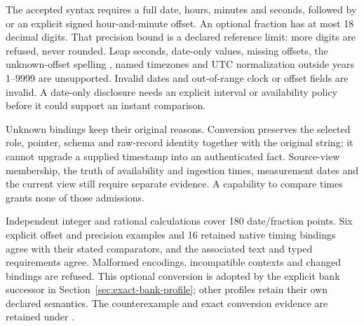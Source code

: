 The accepted syntax requires a full date, hours, minutes and seconds, followed
by  or an explicit signed hour-and-minute offset. An optional fraction
has at most 18 decimal digits. That precision bound is a declared reference
limit: more digits are refused, never rounded. Leap seconds, date-only values,
missing offsets, the unknown-offset spelling , named timezones and
UTC normalization outside years 1--9999 are unsupported. Invalid dates and
out-of-range clock or offset fields are invalid. A date-only disclosure needs
an explicit interval or availability policy before it could support an instant
comparison.

Unknown bindings keep their original reasons. Conversion preserves the selected
role, pointer, schema and raw-record identity together with the original string;
it cannot upgrade a supplied timestamp into an authenticated fact. Source-view
membership, the truth of availability and ingestion times, measurement dates
and the current view still require separate evidence. A capability to compare
times grants none of those admissions.

Independent integer and rational calculations cover 180 date/fraction points.
Six explicit offset and precision examples and 16 retained native timing
bindings agree with their stated comparators, and the associated text and typed
requirements agree. Malformed encodings, incompatible contexts and changed
bindings are refused. This optional conversion is adopted by the explicit
bank successor in Section~\ref{sec:exact-bank-profile}; other profiles retain
their own declared semantics. The counterexample and
exact conversion evidence are retained under
.



